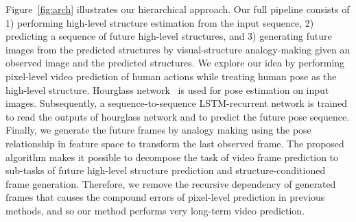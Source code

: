 \documentclass{article}
\begin{document}
Figure~\ref{fig:arch} illustrates our hierarchical approach.
Our full pipeline consists of 1) performing high-level structure estimation from the input sequence, 2) predicting a sequence of future high-level structures, and 3) generating future images from the predicted structures by visual-structure analogy-making given an observed image and the predicted structures.
We explore our idea by performing pixel-level video prediction of human actions while treating human pose as the high-level structure.
Hourglass network~\cite{hourglass} is used for pose estimation on input images.
Subsequently, a sequence-to-sequence LSTM-recurrent network is trained to read the outputs of hourglass network and to predict the future pose sequence.
Finally, we generate the future frames by analogy making using the pose relationship in feature space to transform the last observed frame.
The proposed algorithm makes it possible to decompose the task of video frame prediction to sub-tasks of future high-level structure prediction and structure-conditioned frame generation.
Therefore, we remove the recursive dependency of generated frames that causes the compound errors of pixel-level prediction in previous methods, and so our method performs very long-term video prediction.
\end{document}
